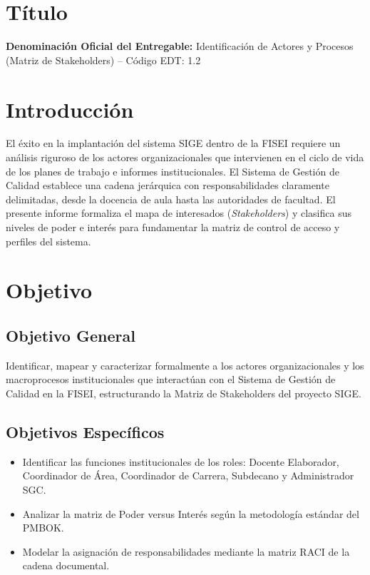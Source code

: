 \documentclass[12pt,a4paper]{article}
\begin{document}
\section{Título}
\textbf{Denominación Oficial del Entregable:} Identificación de Actores y Procesos (Matriz de Stakeholders) -- Código EDT: 1.2

\section{Introducción}
El éxito en la implantación del sistema SIGE dentro de la FISEI requiere un análisis riguroso de los actores organizacionales que intervienen en el ciclo de vida de los planes de trabajo e informes institucionales. El Sistema de Gestión de Calidad establece una cadena jerárquica con responsabilidades claramente delimitadas, desde la docencia de aula hasta las autoridades de facultad. El presente informe formaliza el mapa de interesados (\textit{Stakeholders}) y clasifica sus niveles de poder e interés para fundamentar la matriz de control de acceso y perfiles del sistema.

\section{Objetivo}
\subsection{Objetivo General}
Identificar, mapear y caracterizar formalmente a los actores organizacionales y los macroprocesos institucionales que interactúan con el Sistema de Gestión de Calidad en la FISEI, estructurando la Matriz de Stakeholders del proyecto SIGE.
\subsection{Objetivos Específicos}
\begin{itemize}[leftmargin=1.5em, itemsep=2pt]
    \item Identificar las funciones institucionales de los roles: Docente Elaborador, Coordinador de Área, Coordinador de Carrera, Subdecano y Administrador SGC.
    \item Analizar la matriz de Poder versus Interés según la metodología estándar del PMBOK.
    \item Modelar la asignación de responsabilidades mediante la matriz RACI de la cadena documental.
\end{itemize}
\end{document}
